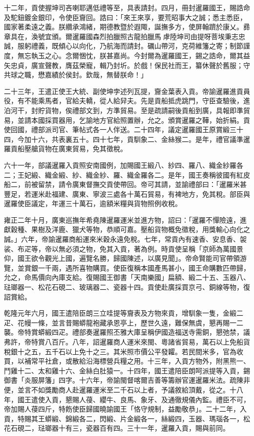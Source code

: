 \begin{pinyinscope}
十二年，貢使握坤司吝喇耶邁低禮等至，具表請封。四月，冊封暹羅國王，賜誥命及駝鈕鍍金銀印，令使臣齎回。誥曰：「來王來享，要荒昭事大之誠；悉主悉臣，國家著柔遠之義。朕纘承鴻緒，期德教暨於遐陬，誕撫多方，使屏翰躋於康乂。彞章具在，渙號宜頒。爾暹羅國森烈拍臘照古龍拍臘馬虖陸坤司由提呀菩埃秉志忠誠，服躬禮義，既傾心以向化，乃航海而請封。礪山帶河，克荷維籓之寄；制節謹度，無忘執玉之心。念爾悃忱，朕甚嘉尚。今封爾為暹羅國王，錫之誥命，爾其益矢忠貞，廣宣聲教，膺茲榮寵，輯乃封圻。於戲！保民社而王，纂休聲於舊服；守共球之職，懋嘉績於侯封。欽哉，無替朕命！」

二十三年，王遣正使王大統、副使坤孛述列瓦提，齎金葉表入貢。帝諭暹羅進貢員役，有不能乘馬者，官給夫轎，從人給舁夫。先是貢船抵虎跳門，守臣查驗後，進泊河干，封貯貨物，俟禮部文到，方準貿易。至是疏請嗣後貢船到廣，具報即準貿易，並請本國採買器用，乞諭地方官給照置辦，允之。頒賞暹羅之鞾，始折絹。貢使回國，禮部派司官、筆帖式各一人伴送。二十四年，議定暹羅國王原賞緞三十四，今加十六，共表裏五十。四十七年，貢馴象二、金絲猴二。是年，禮官議準暹羅貢船壓艙貨物在廣東貿易，免其徵稅。

六十一年，部議暹羅入貢照安南國例，加賜國王緞八、紗四、羅八、織金紗羅各二；王妃緞、織金緞、紗、織金紗、羅、織金羅各二。是年，國王奏稱彼國有紅皮船二，前被留禁，請令廣東督撫交貢使帶回。帝可其請，並諭禮部曰：「暹羅米甚豐足，若運米赴福建、廣東、寧波三處各十萬石貿易，有裨地方，免其稅。部臣與暹羅使臣議定，年運三十萬石，逾額米糧與貨物照例收稅。

雍正二年十月，廣東巡撫年希堯陳暹羅運米並進方物，詔曰：「暹羅不憚險遠，進獻穀種、果樹及洋鹿、獵犬等物，恭順可嘉。壓船貨物概免徵稅，用獎輸心向化之誠。」六年，帝諭暹羅商船運來米穀永遠免稅。七年，常貢內有速香、安息香、袈裟、布疋等，帝以無必須之物，免其入貢，著為例。時貢使呈稱「京師為萬國景仰，國王欲令觀光上國，遍覽名勝，歸國陳述，以廣見聞」。帝命賢能司官帶領游覽，並賞銀一千兩，遇所喜物購買。使臣復稱本國產馬甚小，國王命購數匹帶歸，允之，命馬價向內庫支給。復賜國王御書「天南樂國」扁額、緞二十五、玉器八、琺瑯器一、松花石硯二、玻璃器二、瓷器十四。貢使赴廣採買京弓、銅線等物，復詔賞給。

乾隆元年六月，國王遣陪臣朗三立哇提等齎表及方物來貢，增馴象一隻，金緞二疋、花幔一條，並言昔賜蟒龍袍藏承恩亭上，歷世久遠，難保無虞，懇再賜一二襲。帝特賞蟒緞四疋。禮部奏暹羅照丕雅大庫呈稱伊國造福送寺需銅，懇弛禁，議弗許，帝特賞八百斤。八年，詔暹羅商人運米來閩、粵諸省貿易，萬石以上免船貨稅銀十之五，五千石以上免十之三。其米照市價公平發糶。若民間米多，官為收買，以補常平社倉，或散給沿海標營兵糧之用。十三年，入貢方物外，附黑熊一、鬥雞十二、太和雞十六、金絲白肚猿一。十四年，國王遣陪臣朗呵派提等入貢，錫御書「炎服屏籓」四字。十六年，帝諭閩督喀爾吉善等籌辦官運暹羅米法。疏陳非便，並言不如獎勵商人赴暹羅運米至二千石以上者，予議敘給頂戴，從之。十八年，國王遣使入貢，懇賜人葠、纓牛、良馬、象牙、及通徹規儀內監。禮臣不可，帝加賜人葠四斤，特飭使臣歸國曉諭國王「恪守規制，益勵敬恭」。二十二年，入貢，特賜其王蟒緞、錦緞各二，閃緞、片金緞各一，絲緞四，玉器、瑪瑙各一，松花石硯二，琺瑯器十有三，瓷器百有四。三十一年，暹羅入貢，賜與前同。


\end{pinyinscope}
